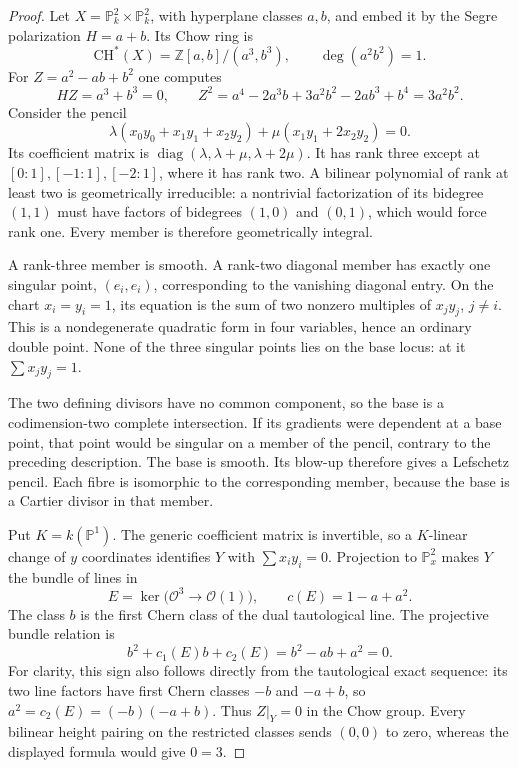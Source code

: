 \documentclass[11pt,a4paper]{article}
\theoremstyle{remark}
\begin{document}
\begin{proof}
Let $X=\mathbb P^2_k\times\mathbb P^2_k$, with hyperplane classes $a,b$,
and embed it by the Segre polarization $H=a+b$.  Its Chow ring is
\[
 \mathrm{CH}^*(X)=\mathbb Z[a,b]/(a^3,b^3),\qquad \deg(a^2b^2)=1.
\]
For $Z=a^2-ab+b^2$ one computes
\[
 HZ=a^3+b^3=0,\qquad
 Z^2=a^4-2a^3b+3a^2b^2-2ab^3+b^4=3a^2b^2.
\]
Consider the pencil
\[
 \lambda(x_0y_0+x_1y_1+x_2y_2)
       +\mu(x_1y_1+2x_2y_2)=0.
\]
Its coefficient matrix is
$\operatorname{diag}(\lambda,\lambda+\mu,\lambda+2\mu)$.  It has rank
three except at $[0:1],[-1:1],[-2:1]$, where it has rank two.  A bilinear
polynomial of rank at least two is geometrically irreducible: a nontrivial
factorization of its bidegree $(1,1)$ must have factors of bidegrees $(1,0)$
and $(0,1)$, which would force rank one.  Every member is therefore
geometrically integral.

A rank-three member is smooth.  A rank-two diagonal member has exactly one
singular point, $(e_i,e_i)$, corresponding to the vanishing diagonal entry.
On the chart $x_i=y_i=1$, its equation is the sum of two nonzero multiples
of $x_jy_j$, $j\ne i$.  This is a nondegenerate quadratic form in four
variables, hence an ordinary double point.  None of the three singular
points lies on the base locus: at it $\sum x_jy_j=1$.

The two defining divisors have no common component, so the base is a
codimension-two complete intersection.  If its gradients were dependent
at a base point, that point would be singular on a member of the pencil,
contrary to the preceding description.  The base is smooth.  Its blow-up
therefore gives a Lefschetz pencil.  Each fibre is isomorphic to the
corresponding member, because the base is a Cartier divisor in that member.

Put $K=k(\mathbb P^1)$.  The generic coefficient matrix is invertible, so
a $K$-linear change of $y$ coordinates identifies $Y$ with
$\sum x_i y_i=0$.  Projection to $\mathbb P^2_x$ makes $Y$ the bundle of
lines in
\[
 E=\ker\bigl(\mathcal O^3\longrightarrow\mathcal O(1)\bigr),\qquad
 c(E)=1-a+a^2.
\]
The class $b$ is the first Chern class of the dual tautological line.
The projective bundle relation is
\[
 b^2+c_1(E)b+c_2(E)=b^2-ab+a^2=0.
\]
For clarity, this sign also follows directly from the tautological exact
sequence: its two line factors have first Chern classes $-b$ and $-a+b$,
so $a^2=c_2(E)=(-b)(-a+b)$.  Thus $Z|_Y=0$ in the Chow group.  Every
bilinear height pairing on the restricted classes sends $(0,0)$ to zero,
whereas the displayed formula would give $0=3$.
\end{proof}
\end{document}
